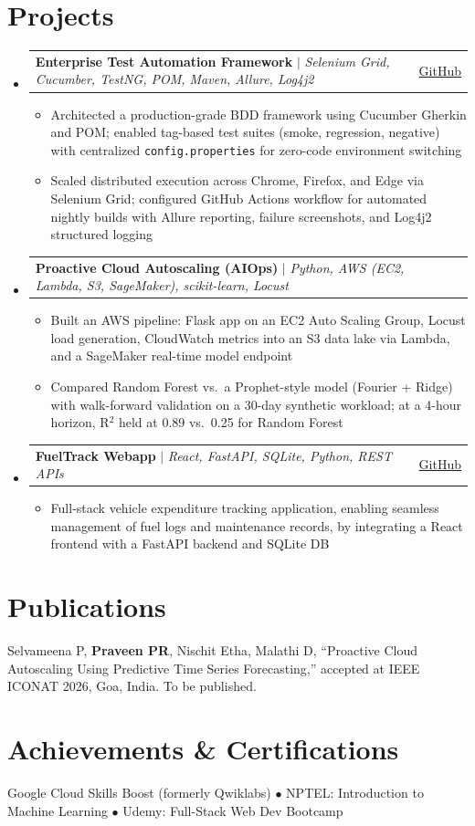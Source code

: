 \documentclass[letterpaper,11pt]{article}
\makeatletter
\newcommand{\resumeItem}[1]{
  \item\small{
    {#1 \vspace{-2pt}}
  }
}
\newcommand{\resumeProjectHeading}[2]{
    \item
    \begin{tabular*}{0.97\textwidth}{l@{\extracolsep{\fill}}r}
      \small#1 & #2 \\
    \end{tabular*}\vspace{-9pt}
}
\newcommand{\resumeSubHeadingListStart}{\begin{itemize}[leftmargin=0.15in, label={}]}
\newcommand{\resumeSubHeadingListEnd}{\end{itemize}}
\newcommand{\resumeItemListStart}{\begin{itemize}}
\newcommand{\resumeItemListEnd}{\end{itemize}\vspace{-5pt}}
\makeatother
\begin{document}
\section{Projects}
    \resumeSubHeadingListStart
      \resumeProjectHeading
          {\textbf{Enterprise Test Automation Framework} $|$ \emph{Selenium Grid, Cucumber, TestNG, POM, Maven, Allure, Log4j2}}{\href{https://github.com/ElementZ76/Test-Automation-Framework-Internal}{GitHub}}
          \resumeItemListStart
            \resumeItem{Architected a production-grade BDD framework using Cucumber Gherkin and POM; enabled tag-based test suites (smoke, regression, negative) with centralized \texttt{config.properties} for zero-code environment switching}
            \resumeItem{Scaled distributed execution across Chrome, Firefox, and Edge via Selenium Grid; configured GitHub Actions workflow for automated nightly builds with Allure reporting, failure screenshots, and Log4j2 structured logging}
          \resumeItemListEnd
      \resumeProjectHeading
          {\textbf{Proactive Cloud Autoscaling (AIOps)} $|$ \emph{Python, AWS (EC2, Lambda, S3, SageMaker), scikit-learn, Locust}}{}
          \resumeItemListStart
            \resumeItem{Built an AWS pipeline: Flask app on an EC2 Auto Scaling Group, Locust load generation, CloudWatch metrics into an S3 data lake via Lambda, and a SageMaker real-time model endpoint}
            \resumeItem{Compared Random Forest vs.\ a Prophet-style model (Fourier + Ridge) with walk-forward validation on a 30-day synthetic workload; at a 4-hour horizon, R$^2$ held at 0.89 vs.\ 0.25 for Random Forest}
          \resumeItemListEnd
        \resumeProjectHeading
              {\textbf{FuelTrack Webapp} $|$ \emph{React, FastAPI, SQLite, Python, REST APIs}}{\href{https://github.com/ElementZ76/Fuel-Track}{GitHub}}
          \resumeItemListStart
            \resumeItem{Full-stack vehicle expenditure tracking application, enabling seamless management of fuel logs and maintenance records, by integrating a React frontend with a FastAPI backend and SQLite DB}
          \resumeItemListEnd
    \resumeSubHeadingListEnd

\section{Publications}
Selvameena P, \textbf{Praveen PR}, Nischit Etha, Malathi D, ``Proactive Cloud Autoscaling Using Predictive Time Series Forecasting,'' accepted at IEEE ICONAT 2026, Goa, India. To be published.

\section{Achievements \& Certifications}
Google Cloud Skills Boost (formerly Qwiklabs) $\bullet$ NPTEL: Introduction to Machine Learning $\bullet$ Udemy: Full-Stack Web Dev Bootcamp
\end{document}
